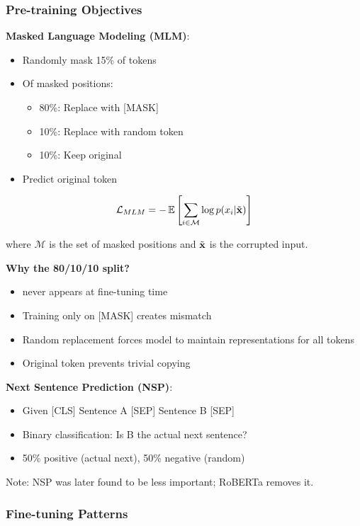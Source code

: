 \subsubsection{Pre-training Objectives}

\textbf{Masked Language Modeling (MLM)}:
\begin{itemize}
    \item Randomly mask 15\% of tokens
    \item Of masked positions:
    \begin{itemize}
        \item 80\%: Replace with [MASK]
        \item 10\%: Replace with random token
        \item 10\%: Keep original
    \end{itemize}
    \item Predict original token
\end{itemize}

\begin{equation}
\mathcal{L}_{MLM} = -\operatorname{\mathbb{E}}\left[\sum_{i \in \mathcal{M}} \log p(x_i | \tilde{\mathbf{x}})\right]
\end{equation}

where $\mathcal{M}$ is the set of masked positions and $\tilde{\mathbf{x}}$ is the corrupted input.

\textbf{Why the 80/10/10 split?}
\begin{itemize}
    \item [MASK] never appears at fine-tuning time
    \item Training only on [MASK] creates mismatch
    \item Random replacement forces model to maintain representations for all tokens
    \item Original token prevents trivial copying
\end{itemize}

\textbf{Next Sentence Prediction (NSP)}:
\begin{itemize}
    \item Given [CLS] Sentence A [SEP] Sentence B [SEP]
    \item Binary classification: Is B the actual next sentence?
    \item 50\% positive (actual next), 50\% negative (random)
\end{itemize}

Note: NSP was later found to be less important; RoBERTa removes it.

\subsubsection{Fine-tuning Patterns}

